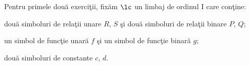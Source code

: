 \documentclass[12pt]{article}
\begin{document}
\renewcommand{\seminarno}{6}
\setcounter{exercitiuno}{0}

\titluseminarLM


\renewcommand{\solution}[1]{}

\parindent0pt



\parindent0pt


Pentru primele dou\u a exerci\c tii, fix\u am $\lc$ un limbaj de ordinul I care con\c{t}ine:
\bi
\item dou\u{a} simboluri de rela\c{t}ii unare $R$, $S$  \c{s}i dou\u{a} simboluri de rela\c{t}ii binare $P$, $Q$;
\item un  simbol de func\c{t}ie unar\u{a} $f$ \c{s}i un simbol de func\c{t}ie binar\u{a} $g$;
\item dou\u{a} simboluri de constante $c$, $d$.
\ei
\end{document}

